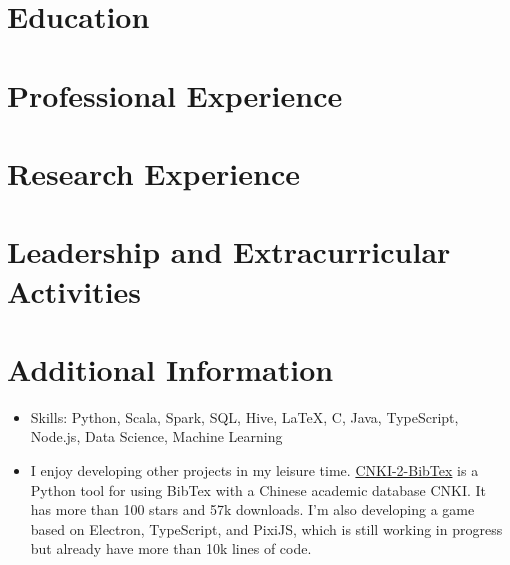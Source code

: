 \documentclass{resumeEN}
\begin{document}
\section{Education}

\pennmaster
\thuundergrad
\umnexchange

\section{Professional Experience}

\msra
\bytedance
\continental
\summitview

\section{Research Experience}

\ryanresearch
\umnresearch
\fifaresearch

\section{Leadership and Extracurricular Activities}

\eydatascience
\cydp
\tkd
\semtech

\section{Additional Information}

\vspace{0.618ex}
\begin{itemize}
\item Skills: Python, Scala, Spark, SQL, Hive, {\LaTeX}, C, Java, TypeScript, Node.js, Data Science, Machine Learning
\item I enjoy developing other projects in my leisure time. \href{https://github.com/Vopaaz/CNKI_2_BibTeX}{CNKI-2-BibTex} is a Python tool for using BibTex with a Chinese academic database CNKI. It has more than 100 stars and 57k downloads. I'm also developing a game based on Electron, TypeScript, and PixiJS, which is still working in progress but already have more than 10k lines of code.
\end{itemize}
\end{document}
